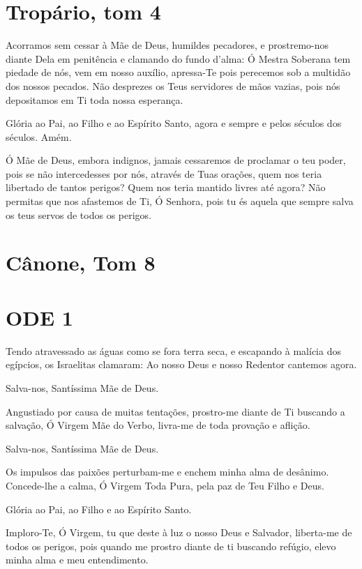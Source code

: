 \documentclass{subfiles}
\begin{document}

\section{Tropário, tom 4}

Acorramos sem cessar à Mãe de Deus, humildes pecadores, e prostremo-nos diante
Dela em penitência e clamando do fundo d'alma: Ó Mestra Soberana tem piedade de
nós, vem em nosso auxílio, apressa-Te pois perecemos sob a multidão dos nossos
pecados. Não desprezes os Teus servidores de mãos vazias, pois nós depositamos
em Ti toda nossa esperança. 

Glória ao Pai, ao Filho e ao Espírito Santo, agora e sempre e pelos
séculos dos séculos. Amém.

Ó Mãe de Deus, embora indignos, jamais cessaremos de proclamar o
teu poder, pois se não intercedesses por nós, através de Tuas orações, quem
nos teria libertado de tantos perigos? Quem nos teria mantido livres até
agora? Não permitas que nos afastemos de Ti, Ó Senhora, pois tu és aquela
que sempre salva os teus servos de todos os perigos.

\section{Cânone, Tom 8}

\section{ODE 1}

\eirmos{}Tendo atravessado as águas como se fora terra seca, e
escapando à malícia dos egípcios, os Israelitas clamaram: Ao nosso Deus e
nosso Redentor cantemos agora.

Salva-nos, Santíssima Mãe de Deus.

Angustiado por causa de muitas tentações, prostro-me diante de Ti
buscando a salvação, Ó Virgem Mãe do Verbo, livra-me de toda provação e
aflição.

Salva-nos, Santíssima Mãe de Deus.

Os impulsos das paixões perturbam-me e enchem minha alma de
desânimo. Concede-lhe a calma, Ó Virgem Toda Pura, pela paz de Teu Filho e
Deus.

Glória ao Pai, ao Filho e ao Espírito Santo.

Imploro-Te, Ó Virgem, tu que deste à luz o nosso Deus e Salvador,
liberta-me de todos os perigos, pois quando me prostro diante de ti buscando
refúgio, elevo minha alma e meu entendimento.
\end{document}
